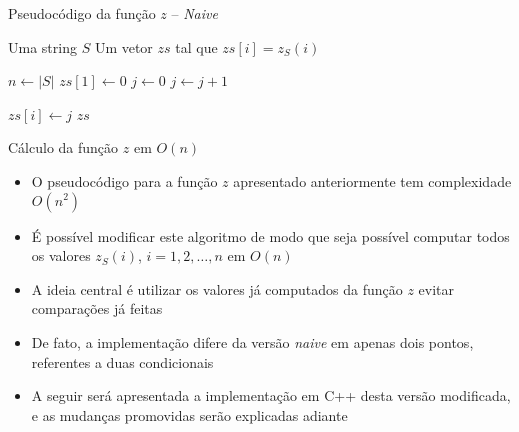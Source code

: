\begin{frame}[fragile]{Pseudocódigo da função $z$ -- \textit{Naive}}

    \begin{algorithm}[H]
        \caption{Função $z$}
        \begin{algorithmic}[1]
            \Require Uma string $S$
            \Ensure Um vetor $zs$ tal que $zs[i] = z_S(i)$

                \State $n \gets |S|$
                \State $zs[1] \gets 0$
                \State 
                    \State $j \gets 0$
                        \State $j \gets j + 1$
                    \EndWhile

                    \State $zs[i] \gets j$
                \EndFor
                \State 
                \State \Return $zs$
            \EndFunction
        \end{algorithmic}
    \end{algorithm}

\end{frame}

\begin{frame}[fragile]{Cálculo da função $z$ em $O(n)$}

    \begin{itemize}
        \item O pseudocódigo para a função $z$ apresentado anteriormente tem complexidade
            $O(n^2)$

        \item É possível modificar este algoritmo de modo que seja possível computar todos os
            valores $z_S(i)$, $i = 1, 2, \ldots, n$ em $O(n)$

        \item A ideia central é utilizar os valores já computados da função $z$ evitar 
            comparações já feitas

        \item De fato, a implementação difere da versão \textit{naive} em apenas dois pontos,
            referentes a duas condicionais

        \item A seguir será apresentada a implementação em C++ desta versão modificada, e
            as mudanças promovidas serão explicadas adiante
    \end{itemize}

\end{frame}

